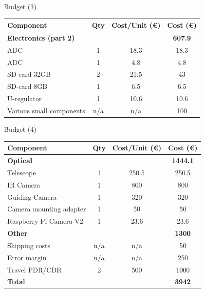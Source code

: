 \documentclass[11pt, aspectratio=169]{beamer}
\begin{document}
\begin{frame}{Budget (3)}
    \centering
    \begin{tabular}{|l|c|c|c|} 
        \hline
        Component & Qty & Cost/Unit (\euro) & Cost (\euro)  \\ 
        \hline
        \rowcolor{Gray}
        \textbf{Electronics (part 2)} &  &  & \textbf{607.9}  \\ 
        ADC & 1 & 18.3 & 18.3  \\ 
        ADC & 1 & 4.8 & 4.8  \\
        SD-card 32GB & 2 & 21.5 & 43  \\
        SD-card 8GB & 1 & 6.5 & 6.5  \\
        U-regulator & 1 & 10.6 & 10.6  \\
        Various small components & n/a & n/a & 100  \\
        \hline
    \end{tabular}
\end{frame}
\begin{frame}{Budget (4)}
    \centering
    \begin{tabular}{|l|c|c|c|} 
        \hline
        Component & Qty & Cost/Unit (\euro) & Cost (\euro)  \\ 
        \hline
        \rowcolor{Gray}
        \textbf{Optical} &  &  & \textbf{1444.1}  \\
        Telescope & 1 & 250.5 & 250.5  \\
        IR Camera & 1 & 800 & 800  \\
        Guiding Camera & 1 & 320 & 320  \\
        Camera mounting adapter & 1 & 50 & 50 \\
        Raspberry Pi Camera V2 & 1 & 23.6 & 23.6  \\ 
        \hline
        \rowcolor{Gray}
        \textbf{Other} &  &  & \textbf{1300}  \\
        Shipping costs & n/a & n/a & 50  \\
        Error margin & n/a & n/a & 250  \\
        Travel PDR/CDR & 2 & 500 & 1000 \\
        \hline
        \textbf{Total} &  &  & \textbf{3942}  \\
        \hline
    \end{tabular}
\end{frame}
\end{document}

